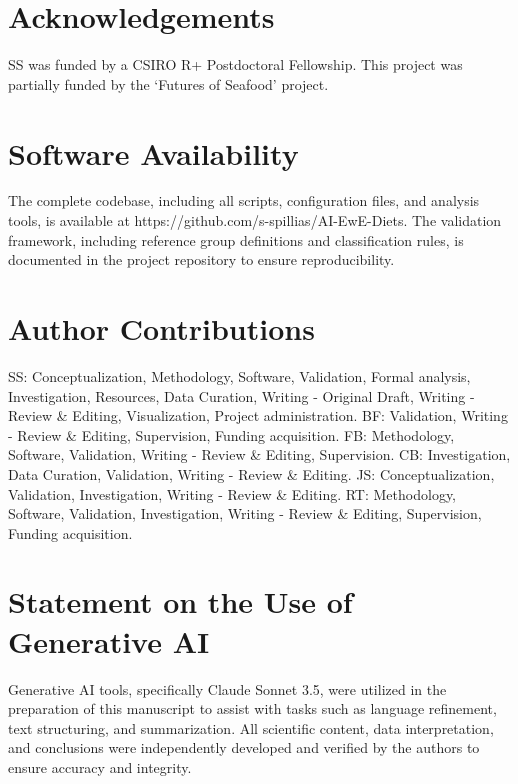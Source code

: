\documentclass[final,12pt]{elsarticle}
\begin{document}
\maketitle


\linenumbers






\section*{Acknowledgements}
SS was funded by a CSIRO R+ Postdoctoral Fellowship. This project was partially funded by the `Futures of Seafood' project.

\section*{Software Availability}
The complete codebase, including all scripts, configuration files, and analysis tools, is available at https://github.com/s-spillias/AI-EwE-Diets. The validation framework, including reference group definitions and classification rules, is documented in the project repository to ensure reproducibility.

\section*{Author Contributions}
SS: Conceptualization, Methodology, Software, Validation, Formal analysis, Investigation, Resources, Data Curation, Writing - Original Draft, Writing - Review \& Editing, Visualization, Project administration. BF: Validation, Writing - Review \& Editing, Supervision, Funding acquisition. FB: Methodology, Software, Validation, Writing - Review \& Editing, Supervision. CB: Investigation, Data Curation, Validation, Writing - Review \& Editing. JS: Conceptualization, Validation, Investigation, Writing - Review \& Editing. RT: Methodology, Software, Validation, Investigation, Writing - Review \& Editing, Supervision, Funding acquisition.

\section*{Statement on the Use of Generative AI}
Generative AI tools, specifically Claude Sonnet 3.5, were utilized in the preparation of this manuscript to assist with tasks such as language refinement, text structuring, and summarization. All scientific content, data interpretation, and conclusions were independently developed and verified by the authors to ensure accuracy and integrity.




\clearpage

\end{document}
